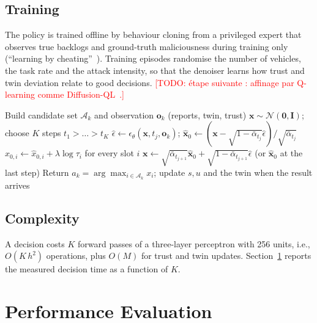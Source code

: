 \documentclass[journal]{IEEEtran}
\newcommand{\todo}[1]{\textcolor{red}{[TODO: #1]}}
\newcommand{\tgd}{TG-Diff}
\begin{document}
\subsection{Training}
The policy is trained offline by behaviour cloning from a privileged expert that observes true backlogs and ground-truth maliciousness during training only (``learning by cheating''~\cite{chen2020lbc}). Training episodes randomise the number of vehicles, the task rate and the attack intensity, so that the denoiser learns how trust and twin deviation relate to good decisions. \todo{étape suivante : affinage par Q-learning comme Diffusion-QL~\cite{wang2023diffusionql}.}

\begin{algorithm}[t]
\caption{\tgd{} decision for one task}\label{alg:tgdiff}
\begin{algorithmic}[1]
\STATE Build candidate set $\mathcal{A}_k$ and observation $\mathbf{o}_k$ (reports, twin, trust)
\STATE $\mathbf{x}\sim\mathcal{N}(\mathbf{0},\mathbf{I})$; choose $K$ steps $t_1>\dots>t_K$
\STATE $\hat\epsilon\leftarrow\epsilon_\theta(\mathbf{x},t_j,\mathbf{o}_k)$; $\hat{\mathbf{x}}_0\leftarrow(\mathbf{x}-\sqrt{1-\bar\alpha_{t_j}}\hat\epsilon)/\sqrt{\bar\alpha_{t_j}}$
\STATE $\hat{x}_{0,i}\leftarrow \hat{x}_{0,i}+\lambda\log\tau_i$ for every slot $i$
\STATE $\mathbf{x}\leftarrow\sqrt{\bar\alpha_{t_{j+1}}}\hat{\mathbf{x}}_0+\sqrt{1-\bar\alpha_{t_{j+1}}}\hat\epsilon$ (or $\hat{\mathbf{x}}_0$ at the last step)
\ENDFOR
\STATE Return $a_k=\arg\max_{i\in\mathcal{A}_k} x_i$; update $s,u$ and the twin when the result arrives
\end{algorithmic}
\end{algorithm}

\subsection{Complexity}
A decision costs $K$ forward passes of a three-layer perceptron with 256 units, i.e., $O(K\,h^2)$ operations, plus $O(M)$ for trust and twin updates. Section~\ref{sec:eval} reports the measured decision time as a function of $K$.

\section{Performance Evaluation}\label{sec:eval}


\end{document}
